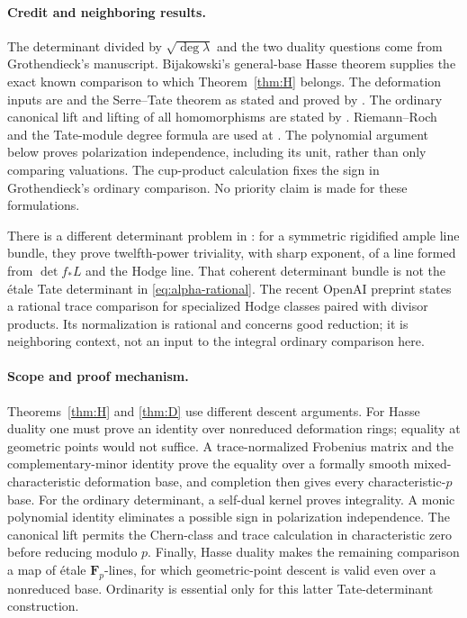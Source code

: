 \documentclass[11pt]{article}
\theoremstyle{definition}\newtheorem{definition}[theorem]{Definition}
\theoremstyle{remark}\newtheorem{remark}[theorem]{Remark}
\newcommand{\FF}{\mathbf F}
\begin{document}
\paragraph{Credit and neighboring results.}
The determinant divided by $\sqrt{\deg\lambda}$ and the two duality questions come from Grothendieck's manuscript. Bijakowski's general-base Hasse theorem supplies the exact known comparison to which Theorem~\ref{thm:H} belongs. The deformation inputs are \citet[Corollary~4.8(i), pp.~180--181]{Illusie} and the Serre--Tate theorem as stated and proved by \citet[Theorem~1.2.1, pp.~143--146]{Katz}. The ordinary canonical lift and lifting of all homomorphisms are stated by \citet[Theorem~1.4 and the following paragraph, p.~115]{DworkOgus}. Riemann--Roch and the Tate-module degree formula are used at \citet[Theorems~9.11 and 12.18, pp.~131--133 and 186--187]{EGM}. The polynomial argument below proves polarization independence, including its unit, rather than only comparing valuations. The cup-product calculation fixes the sign in Grothendieck's ordinary comparison. No priority claim is made for these formulations.

There is a different determinant problem in \citet[Theorem~1.2 and the surrounding introduction, pp.~1--2]{MaillotRossler}: for a symmetric rigidified ample line bundle, they prove twelfth-power triviality, with sharp exponent, of a line formed from $\det f_*L$ and the Hodge line. That coherent determinant bundle is not the \'etale Tate determinant in \eqref{eq:alpha-rational}. The recent OpenAI preprint \citep[Theorem~1.1 and Introduction, pp.~1--3]{OpenAI} states a rational trace comparison for specialized Hodge classes paired with divisor products. Its normalization is rational and concerns good reduction; it is neighboring context, not an input to the integral ordinary comparison here.

\paragraph{Scope and proof mechanism.}
Theorems~\ref{thm:H} and \ref{thm:D} use different descent arguments. For Hasse duality one must prove an identity over nonreduced deformation rings; equality at geometric points would not suffice. A trace-normalized Frobenius matrix and the complementary-minor identity prove the equality over a formally smooth mixed-characteristic deformation base, and completion then gives every characteristic-$p$ base. For the ordinary determinant, a self-dual kernel proves integrality. A monic polynomial identity eliminates a possible sign in polarization independence. The canonical lift permits the Chern-class and trace calculation in characteristic zero before reducing modulo $p$. Finally, Hasse duality makes the remaining comparison a map of \'etale $\FF_p$-lines, for which geometric-point descent is valid even over a nonreduced base. Ordinarity is essential only for this latter Tate-determinant construction.
\end{document}
